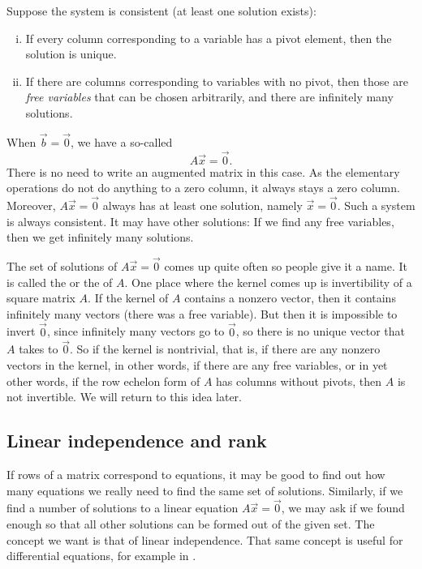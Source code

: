 Suppose the system is consistent (at least one solution exists):
\begin{enumerate}[(i)]
\item If every column corresponding to a variable has a pivot element,
then the solution is unique.
\item If there are columns corresponding to variables with no pivot,
then those are \emph{free variables} that can be chosen
arbitrarily, and there are infinitely many solutions.
\end{enumerate}

\medskip

When $\vec{b} = \vec{0}$, we have a so-called
\emph{}
\begin{equation*}
A \vec{x} = \vec{0} .
\end{equation*}
There is no need to write an augmented matrix in this
case.  As the elementary operations do not do anything to a zero column, it
always stays a zero column.  Moreover, $A \vec{x} = \vec{0}$ always has at
least one solution, namely $\vec{x} = \vec{0}$.  Such a system
is always consistent.  It may have other solutions:  If we find
any free variables, then we get infinitely many solutions.

The set of solutions of $A \vec{x} = \vec{0}$ comes up quite often
so people give it a name.  It is called the
\emph{} or the
\emph{} of $A$.
One place where the kernel comes up is invertibility of a square matrix $A$.
If the kernel of $A$ contains a nonzero vector, then it contains
infinitely many vectors (there was a free variable).  But then it is
impossible to invert $\vec{0}$, since infinitely many vectors go to
$\vec{0}$, so there is no unique vector that $A$ takes to $\vec{0}$.
So if the kernel is nontrivial, that is, if there are any nonzero vectors in
the kernel,
in other words, if there are any free variables, or in yet other words,
if the row echelon form of $A$ has columns without pivots,
then $A$ is not invertible.  We will return to this idea later.

\subsection{Linear independence and rank}

If rows of a matrix correspond to equations, it may be good to find out
how many equations we really need to find the same set of solutions.
Similarly, if we find a number of solutions to a linear equation
$A \vec{x} = \vec{0}$, we may ask if we found enough
so that all other solutions can be formed out of the given set.
The concept we want is that of linear independence.
That same concept is useful for differential equations, for
example in .

